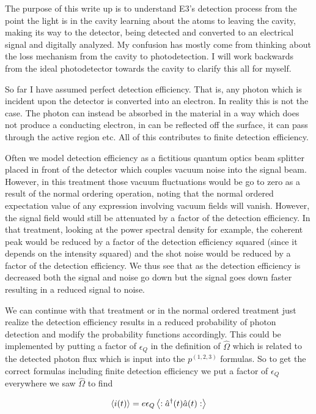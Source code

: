 \documentclass[12pt]{article}
\begin{document}
The purpose of this write up is to understand E3's detection process from the point the light is in the cavity learning about the atoms to leaving the cavity, making its way to the detector, being detected and converted to an electrical signal and digitally analyzed. My confusion has mostly come from thinking about the loss mechanism from the cavity to photodetection. I will work backwards from the ideal photodetector towards the cavity to clarify this all for myself.

So far I have assumed perfect detection efficiency. That is, any photon which is incident upon the detector is converted into an electron. In reality this is not the case. The photon can instead be absorbed in the material in a way which does not produce a conducting electron, in can be reflected off the surface, it can pass through the active region etc. All of this contributes to finite detection efficiency.

Often we model detection efficiency as a fictitious quantum optics beam splitter placed in front of the detector which couples vacuum noise into the signal beam. However, in this treatment those vacuum fluctuations would be go to zero as a result of the normal ordering operation, noting that the normal ordered expectation value of any expression involving vacuum fields will vanish. However, the signal field would still be attenuated by a factor of the detection efficiency. In that treatment, looking at the power spectral density for example, the coherent peak would be reduced by a factor of the detection efficiency squared (since it depends on the intensity squared) and the shot noise would be reduced by a factor of the detection efficiency. We thus see that as the detection efficiency is decreased both the signal and noise go down but the signal goes down faster resulting in a reduced signal to noise.

We can continue with that treatment or in the normal ordered treatment just realize the detection efficiency results in a reduced probability of photon detection and modify the probability functions accordingly. This could be implemented by putting a factor of $\epsilon_Q$ in the definition of $\hat{\Omega}$ which is related to the detected photon flux which is input into the $p^{(1,2,3)}$ formulas. So to get the correct formulas including finite detection efficiency we put a factor of $\epsilon_Q$ everywhere we saw $\hat{\Omega}$ to find

\begin{align}
\braket{i(t)} = e \epsilon_Q \left<:\hat{a}^{\dag}(t) \hat{a}(t):\right> 
\end{align}
\end{document}
